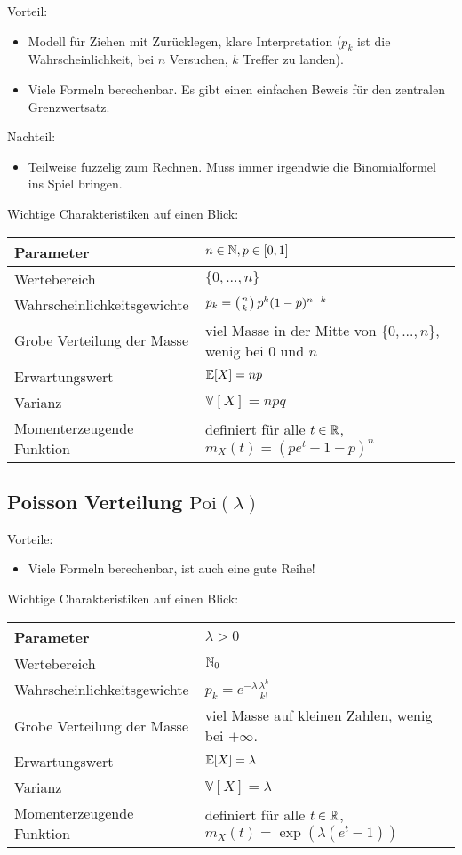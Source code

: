 \documentclass[11pt, a4paper]{book}
\begin{document}
{Vorteil:} 
\begin{itemize}
	\item Modell f\"ur Ziehen mit Zur\"ucklegen, klare Interpretation ($p_k$ ist die Wahrscheinlichkeit, bei $n$ Versuchen, $k$ Treffer zu landen).
	\item Viele Formeln berechenbar. Es gibt einen einfachen Beweis f\"ur den zentralen Grenzwertsatz.
\end{itemize}
Nachteil:
\begin{itemize}
 	\item Teilweise fuzzelig zum Rechnen. Muss immer irgendwie die Binomialformel ins Spiel bringen.
\end{itemize}
Wichtige Charakteristiken auf einen Blick:
\begin{center}
\begin{tabular}[h]{|l|l|}
\hline
Parameter& $n\in \mathbb{N}, p\in [0,1]$ \\
\hline
Wertebereich & $\{0,...,n\}$\\
\hline
Wahrscheinlichkeitsgewichte& $p_k=\left(n\atop k\right) p^k(1-p)^{n-k}$\\
\hline
Grobe Verteilung der Masse & viel Masse in der Mitte von $\{0,...,n\}$, wenig bei $0$ und $n$\\
\hline
Erwartungswert& $\mathbb{E}[X]=np $ \\
\hline
Varianz & $\mathbb V[X]=npq$\\
\hline
Momenterzeugende Funktion& definiert f\"ur alle $t\in \mathbb{R}$, $m_X(t)=(pe^t+1-p)^n$\\
\hline
\end{tabular}
\end{center}


\subsection{Poisson Verteilung $\text{Poi}(\lambda)$}

{Vorteile:} 
\begin{itemize}
	\item Viele Formeln berechenbar, ist auch eine gute Reihe!
\end{itemize}


Wichtige Charakteristiken auf einen Blick:
\begin{center}
\begin{tabular}[h]{|l|l|}
\hline
Parameter& $\lambda>0$ \\
\hline
Wertebereich & $\mathbb{N}_0$\\
\hline
Wahrscheinlichkeitsgewichte& $p_k=e^{-\lambda} \frac{\lambda^k}{k!}$\\
\hline
Grobe Verteilung der Masse & viel Masse auf kleinen Zahlen, wenig bei $+\infty$.\\
\hline
Erwartungswert& $\mathbb{E}[X]=\lambda$ \\
\hline
Varianz & $\mathbb V[X]=\lambda$\\
\hline
Momenterzeugende Funktion& definiert f\"ur alle $t\in \mathbb{R}$, $m_X(t)=\exp(\lambda(e^t-1))$\\
\hline
\end{tabular}
\end{center}
\end{document}
